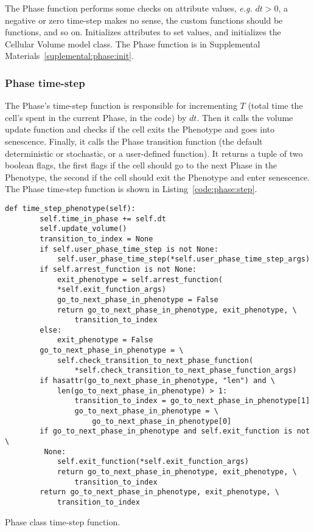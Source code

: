 The Phase  function performs some checks on attribute values, \textit{e.g.} $dt>0$, a negative or zero time-step makes no sense, the custom functions should be functions, and so on. Initializes attributes to set values, and initializes the Cellular Volume model class. The Phase  function is in Supplemental Materials~\ref{suplemental:phase:init}.

\subsubsection{Phase time-step}\label{sec:meth:phase:step}

The Phase's time-step function is responsible for incrementing $T$ (total time the cell's spent in the current Phase,  in the code) by $dt$. Then it calls the volume update function and checks if the cell exits the Phenotype and goes into senescence. Finally, it calls the Phase transition function (the default deterministic or stochastic, or a user-defined function). It returns a tuple of two boolean flags, the first flags if the cell should go to the next Phase in the Phenotype, the second if the cell should exit the Phenotype and enter senescence. The Phase time-step function is shown in Listing~\ref{code:phase:step}.

\begin{listing}[!htb]
\begin{verbatim}
def time_step_phenotype(self):
        self.time_in_phase += self.dt
        self.update_volume()
        transition_to_index = None
        if self.user_phase_time_step is not None:
            self.user_phase_time_step(*self.user_phase_time_step_args)
        if self.arrest_function is not None:
            exit_phenotype = self.arrest_function(
            *self.exit_function_args)
            go_to_next_phase_in_phenotype = False
            return go_to_next_phase_in_phenotype, exit_phenotype, \
                transition_to_index
        else:
            exit_phenotype = False
        go_to_next_phase_in_phenotype = \
            self.check_transition_to_next_phase_function(
                *self.check_transition_to_next_phase_function_args)
        if hasattr(go_to_next_phase_in_phenotype, "len") and \
            len(go_to_next_phase_in_phenotype) > 1:
                transition_to_index = go_to_next_phase_in_phenotype[1]
                go_to_next_phase_in_phenotype = \
                    go_to_next_phase_in_phenotype[0]
        if go_to_next_phase_in_phenotype and self.exit_function is not \
         None:
            self.exit_function(*self.exit_function_args)
            return go_to_next_phase_in_phenotype, exit_phenotype, \
                transition_to_index
        return go_to_next_phase_in_phenotype, exit_phenotype, \
            transition_to_index
\end{verbatim}
\caption{Phase class time-step function.}\label{code:phase:step}
\end{listing}


